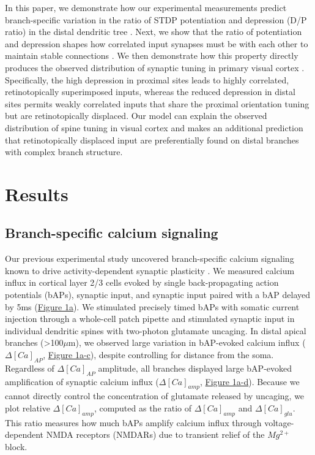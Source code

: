 In this paper, we demonstrate how our experimental measurements predict branch-specific variation in the ratio of STDP potentiation and depression (D/P ratio) in the distal dendritic tree \citep{nevianSpineCa2Signaling2006}. Next, we show that the ratio of potentiation and depression shapes how correlated input synapses must be with each other to maintain stable connections \citep{songCompetitiveHebbianLearning2000}. We then demonstrate how this property directly produces the observed distribution of synaptic tuning in primary visual cortex \citep{iacarusoSynapticOrganizationVisual2017}. Specifically, the high depression in proximal sites leads to highly correlated, retinotopically superimposed inputs, whereas the reduced depression in distal sites permits weakly correlated inputs that share the proximal orientation tuning but are retinotopically displaced. Our model can explain the observed distribution of spine tuning in visual cortex and makes an additional prediction that retinotopically displaced input are preferentially found on distal branches with complex branch structure.


\section*{Results}\label{s:results}

\subsection*{Branch-specific calcium signaling}
Our previous experimental study uncovered branch-specific calcium signaling known to drive activity-dependent synaptic plasticity \citep{landauDendriticBranchStructure2022, nevianSpineCa2Signaling2006}. We measured calcium influx in cortical layer 2/3 cells evoked by single back-propagating action potentials (bAPs), synaptic input, and synaptic input paired with a bAP delayed by 5ms (\hyperref[fig:1]{Figure 1a}). We stimulated precisely timed bAPs with somatic current injection through a whole-cell patch pipette and stimulated synaptic input in individual dendritic spines with two-photon glutamate uncaging. In distal apical branches (>100$\mu$m), we observed large variation in bAP-evoked calcium influx ($\Delta[Ca]_{AP}$, \hyperref[fig:1]{Figure 1a-c}), despite controlling for distance from the soma. Regardless of $\Delta[Ca]_{AP}$ amplitude, all branches displayed large bAP-evoked amplification of synaptic calcium influx ($\Delta[Ca]_{amp}$, \hyperref[fig:1]{Figure 1a-d}). Because we cannot directly control the concentration of glutamate released by uncaging, we plot relative $\Delta[Ca]_{amp}$, computed as the ratio of $\Delta[Ca]_{amp}$ and $\Delta[Ca]_{glu}$. This ratio measures how much bAPs amplify calcium influx through voltage-dependent NMDA receptors (NMDARs) due to transient relief of the $Mg^{2+}$ block. 

